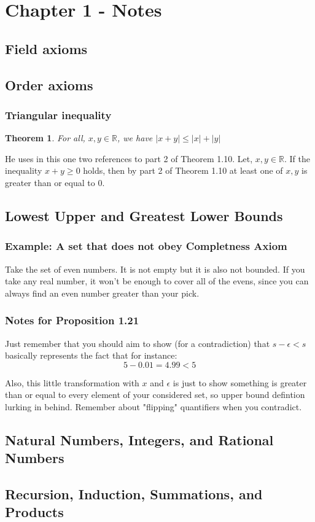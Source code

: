 \documentclass{article}
\newtheorem*{theorem}{Theorem}
\begin{document}
\section{Chapter 1 - Notes}
\subsection{Field axioms}
\subsection{Order axioms}
\subsubsection{Triangular inequality}
\begin{theorem}
    For all, \(x, y \in \mathbb{R}\), we have \(|x + y| \leq |x| + |y|\)
\end{theorem}

He uses in this one two references to part 2 of Theorem 1.10. Let, \(x, y \in \mathbb{R}\). If the
inequality \(x + y \geq 0\) holds, then by part 2 of Theorem 1.10 at least one of \(x, y\) is greater than or equal to \(0\).

\subsection{Lowest Upper and Greatest Lower Bounds}
\subsubsection*{Example: A set that does not obey Completness Axiom}
Take the set of even numbers. It is not empty but it is also not bounded. If you take any real number, it won't be enough
to cover all of the evens, since you can always find an even number greater than your pick.
\subsubsection*{Notes for Proposition 1.21}
Just remember that you should aim to show (for a contradiction) that \(s - \epsilon < s\) basically represents the fact that for instance:
\begin{equation*}
    5 - 0.01 = 4.99 < 5 
\end{equation*}

Also, this little transformation with \(x\) and \(\epsilon\) is just to show something is greater than or equal to every element 
of your considered set, so upper bound defintion lurking in behind. Remember about "flipping" quantifiers when you contradict.

\subsection{Natural Numbers, Integers, and Rational Numbers}
\subsection{Recursion, Induction, Summations, and Products}
\end{document}
